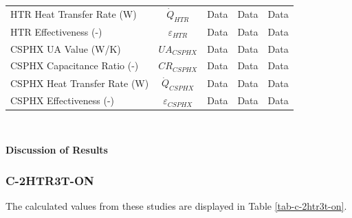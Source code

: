 \begin{paracol}{2}
\begin{specialtable}[htbp]
\begin{tabular}{lcccc}
    HTR Heat Transfer Rate (W)	&	$\dot{Q}_{HTR}$	&	Data	&	Data	&	Data	\\
    HTR Effectiveness (-)	&	$\varepsilon_{HTR}$	&	Data	&	Data	&	Data	\\
    CSPHX UA Value (W/K)	&	$UA_{CSPHX}$	&	Data	&	Data	&	Data	\\
    CSPHX Capacitance Ratio (-)	&	$CR_{CSPHX}$	&	Data	&	Data	&	Data	\\
    CSPHX Heat Transfer Rate (W)	&	$\dot{Q}_{CSPHX}$	&	Data	&	Data	&	Data	\\
    CSPHX Effectiveness (-)	&	$\varepsilon_{CSPHX}$	&	Data	&	Data	&	Data	\\
    \bottomrule
    \end{tabular}\\
\end{specialtable}

\textbf{Discussion of Results}

\subsubsection{C-2HTR3T-ON}

The calculated values from these studies are displayed in Table \ref{tab-c-2htr3t-on}.


\end{paracol}
